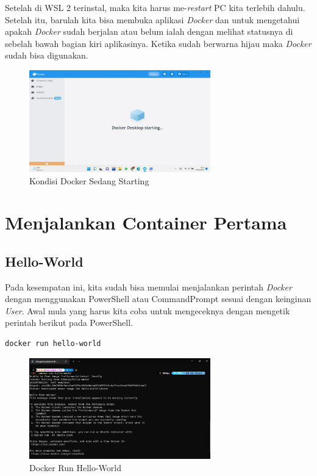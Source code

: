 \documentclass[11pt,a4paper]{article}
\begin{document}
    Setelah di WSL 2 terinstal, maka kita harus me-\textit{restart} PC kita terlebih dahulu. Setelah itu, barulah
    kita bisa membuka aplikasi \textit{Docker} dan untuk mengetahui apakah \textit{Docker} sudah berjalan atau belum 
    ialah dengan melihat statusnya di sebelah bawah bagian kiri aplikasinya. Ketika sudah berwarna hijau maka \textit{Docker} 
    sudah bisa digunakan.
    \begin{figure}[h]
        \centering
        \includegraphics[width = 0.7\textwidth]{Figures/docker-running_1.png}
        \caption{Kondisi Docker Sedang Starting}
    \end{figure}

\newpage
\section{Menjalankan Container Pertama}
\subsection{Hello-World}
    Pada kesempatan ini, kita sudah bisa memulai menjalankan perintah \textit{Docker} dengan menggunakan PowerShell atau CommandPrompt 
    sesuai dengan keinginan \textit{User}. Awal mula yang harus kita coba untuk mengeceknya dengan mengetik perintah berikut pada PowerShell.
    \begin{lstlisting}[language=bash]
        docker run hello-world
    \end{lstlisting}

    \begin{figure}[h]
        \centering
        \includegraphics[width = 0.7\textwidth]{Figures/docker-run hello world.png}
        \caption{Docker Run Hello-World}
    \end{figure}
\end{document}
